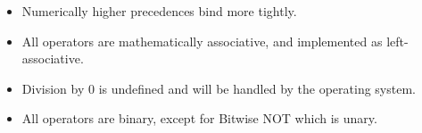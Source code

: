 \documentclass[a4wide, 11pt]{article}
\begin{document}
\begin{itemize}
\item Numerically higher precedences bind more tightly.

\item All operators are mathematically associative, and implemented as
left-associative.

\item Division by 0 is undefined and will be handled by the operating system.

\item All operators are binary, except for Bitwise NOT which is unary.
\end{itemize}
\end{document}
